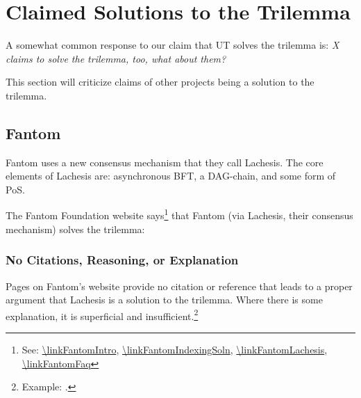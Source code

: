 \section{Claimed Solutions to the Trilemma}

\label{sec:claimed-trilemma-solns}

A somewhat common response to our claim that UT solves the trilemma is: \emph{X claims to solve the trilemma, too, what about them?}

This section will criticize claims of other projects being a solution to the trilemma.

\subsection{Fantom}

Fantom uses a new consensus mechanism that they call Lachesis.
The core elements of Lachesis are: asynchronous BFT, a DAG-chain, and some form of PoS.

The Fantom Foundation website says\footnote{
    See: \url{\linkFantomIntro}, \url{\linkFantomIndexingSoln}, \url{\linkFantomLachesis}, \url{\linkFantomFaq}
} that Fantom (via Lachesis, their consensus mechanism) solves the trilemma:







\subsubsection{No Citations, Reasoning, or Explanation}

Pages on Fantom's website provide no citation or reference that leads to a proper argument that Lachesis is a solution to the trilemma.
Where there is some explanation, it is superficial and insufficient.\footnote{
    Example: \citeFantomLachesis.
}

